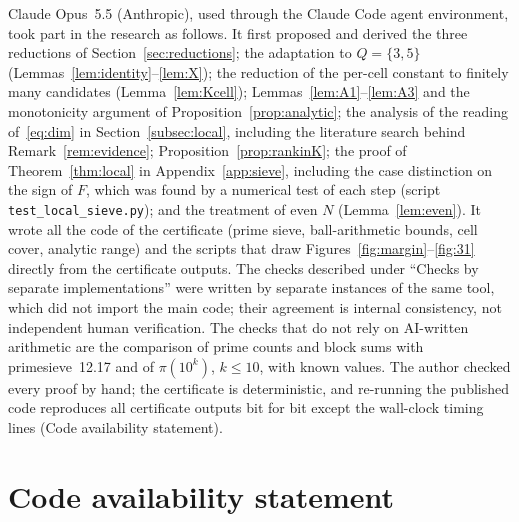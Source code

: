\documentclass[preprint,11pt]{elsarticle}
\theoremstyle{definition}
\theoremstyle{remark}
\numberwithin{equation}{section}
\begin{document}
Claude Opus~5.5 (Anthropic), used through the Claude Code agent
environment, took part in the research as follows. It first proposed and
derived the three reductions of Section~\ref{sec:reductions}; the
adaptation to $Q=\{3,5\}$ (Lemmas~\ref{lem:identity}--\ref{lem:X}); the
reduction of the per-cell constant to finitely many candidates
(Lemma~\ref{lem:Kcell}); Lemmas~\ref{lem:A1}--\ref{lem:A3} and the
monotonicity argument of Proposition~\ref{prop:analytic}; the analysis of
the reading of~\eqref{eq:dim} in Section~\ref{subsec:local}, including
the literature search behind Remark~\ref{rem:evidence};
Proposition~\ref{prop:rankinK}; the proof of Theorem~\ref{thm:local} in
Appendix~\ref{app:sieve}, including the case distinction on the sign of
$F$, which was found by a numerical test of each step
(script \texttt{test\_local\_sieve.py}); and the
treatment of even $N$ (Lemma~\ref{lem:even}). It wrote all the code of the certificate
(prime sieve, ball-arithmetic bounds, cell cover, analytic range) and the
scripts that draw Figures~\ref{fig:margin}--\ref{fig:31} directly from
the certificate outputs. The checks described under ``Checks by separate
implementations'' were written by separate instances of the same tool,
which did not import the main code; their agreement is internal
consistency, not independent human verification. The checks that do not
rely on AI-written arithmetic are the comparison of prime counts and block
sums with primesieve~12.17 and of $\pi(10^k)$, $k\le10$, with known
values. The author checked every proof by hand; the certificate is
deterministic, and re-running the published code reproduces all
certificate outputs bit for bit except the wall-clock timing lines
(Code availability statement).

\section*{Code availability statement}
\end{document}
